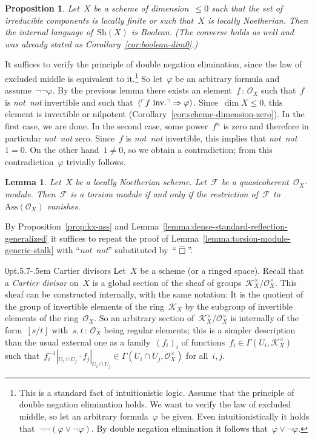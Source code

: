 \documentclass[10pt,reqno,a4paper]{amsbook}
\makeatletter
\theoremstyle{definition}
\theoremstyle{plain}
\newtheorem{prop}[defn]{Proposition}
\newtheorem{lemma}[defn]{Lemma}
\theoremstyle{remark}
\newcommand{\F}{\mathcal{F}}
\renewcommand{\O}{\mathcal{O}}
\newcommand{\K}{\mathcal{K}}
\newcommand{\Sh}{\mathrm{Sh}}
\newcommand{\Ass}{\mathrm{Ass}}
\newcommand{\?}{\,{:}\,}
\renewcommand{\_}{\mathpunct{.}\,}
\newcommand{\speak}[1]{\ulcorner\text{\textnormal{#1}}\urcorner}
\newcommand{\sdense}{{\widehat\Box}}
\newcommand{\inv}{inv.\@}
\newcommand{\notnot}{\emph{not~not}\xspace}
\renewenvironment{proof}[1][\proofname]{\par
  \pushQED{\qed}%
  \normalfont \topsep6\p@\@plus6\p@\relax
  \trivlist
  \item[\hskip\labelsep
        \itshape
    #1\@addpunct{.}]\ignorespaces
}{%
  \popQED\endtrivlist\@endpefalse
}
\def\subsection{\@startsection{subsection}{2}%
  {0pt}{.5\linespacing\@plus.7\linespacing}{-.5em}%
  {\normalfont\bfseries}}
\makeatother
\begin{document}
\begin{prop}\label{prop:boolean-dim0-continued}
Let~$X$ be a scheme of dimension~$\leq 0$ such that the set of irreducible components is locally finite or such that~$X$ is locally Noetherian. Then
the internal language of~$\Sh(X)$ is Boolean. (The converse holds as well and
was already stated as Corollary~\ref{cor:boolean-dim0}.)
\end{prop}
\begin{proof}
It suffices to verify the principle of double negation elimination, since the
law of excluded middle is equivalent to it.\footnote{This is a standard fact of
intuitionistic logic. Assume that the principle of double negation elimination
holds. We want to verify the law of excluded middle, so let an arbitrary
formula~$\varphi$ be given. Even intuitionistically it holds
that~$\neg\neg(\varphi \vee \neg\varphi)$. By double negation elimination it
follows that~$\varphi \vee \neg\varphi$.}
So let~$\varphi$ be an arbitrary formula and assume~$\neg\neg\varphi$. By the
previous lemma there exists an element~$f\?\O_X$ such that~$f$ is \notnot
invertible and such that~$(\speak{$f$ \inv} \Rightarrow \varphi)$. Since~$\dim
X \leq 0$, this element is invertible or nilpotent
(Corollary~\ref{cor:scheme-dimension-zero}).  In the first case, we are done.
In the second case, some power~$f^n$ is zero and therefore in particular
\notnot zero. Since~$f$ is \notnot invertible, this implies that \notnot~$1 =
0$. On the other hand~$1 \neq 0$, so we obtain a contradiction; from this
contradiction~$\varphi$ trivially follows.
\end{proof}

\begin{lemma}\label{lemma:torsion-module-generic-stalk-generalized}
Let~$X$ be a locally Noetherian scheme. Let~$\F$ be a
quasicoherent~$\O_X$-module. Then~$\F$ is a torsion module if and only if the
restriction of~$\F$ to~$\Ass(\O_X)$ vanishes.
\end{lemma}
\begin{proof}By Proposition~\ref{prop:kx-ass} and
Lemma~\ref{lemma:dense-standard-reflection-generalized} it suffices to repeat
the proof of Lemma~\ref{lemma:torsion-module-generic-stalk} with
``\notnot'' substituted by~``$\sdense$''.
\end{proof}


\subsection{Cartier divisors} Let~$X$ be a scheme (or a ringed space). Recall
that a \emph{Cartier divisor} on~$X$ is a global section of the sheaf of
groups~$\K_X^\times / \O_X^\times$. This sheaf can be constructed internally, with the
same notation: It is the quotient of the group of invertible elements of the
ring~$\K_X$ by the subgroup of invertible elements of the ring~$\O_X$. So an
arbitrary section of~$\K_X^\times/\O_X^\times$ is internally of the form~$[s/t]$
with~$s,t\?\O_X$ being regular elements; this is a simpler description than the
usual external one as a family~$(f_i)_i$ of functions~$f_i \in
\Gamma(U_i,\K_X^\times)$ such that~$f_i^{-1}|_{U_i \cap U_j} \cdot f_j|_{U_i \cap
U_j} \in \Gamma(U_i \cap U_j, \O_X^\times)$ for all~$i,j$.
\end{document}
